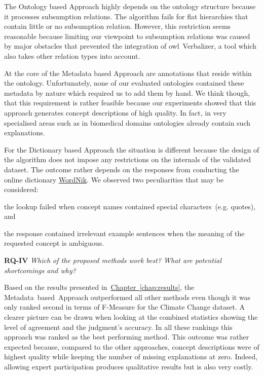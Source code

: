 The Ontology based Approach highly depends on the ontology structure because it processes subsumption relations. The algorithm fails for flat hierarchies that contain little or no subsumption relation. However, this restriction seems reasonable because limiting our viewpoint to subsumption relations was caused by major obstacles that prevented the integration of \gls{owl}~Verbalizer, a tool which also takes other relation types into account. 

At the core of the Metadata based Approach are annotations that reside within the ontology. Unfortunately, none of our evaluated ontologies contained these metadata by nature which required us to add them by hand. We think though, that this requirement is rather feasible because our experiments showed that this approach generates concept descriptions of high quality.  In fact, in very specialised areas such as in biomedical domains ontologies already contain such explanations. 

For the Dictionary based Approach the situation is different because the design of the algorithm does not impose any restrictions on the internals of the validated dataset. The outcome rather depends on the responses from conducting the online dictionary \hyperref[sec:wordnik]{WordNik}. We observed two peculiarities that may be considered:
\begin{inparaenum}[i)]
	\item the lookup failed when concept names contained special characters~(e.g. quotes), and
	\item the response contained irrelevant example sentences when the meaning of the requested concept is ambiguous.
\end{inparaenum}


\textbf{RQ-IV} \emph{Which of the proposed methods work best? What are potential shortcomings and why?} 

Based on the results presented in~\hyperref[chap:results]{Chapter~\ref*{chap:results}}, the Metadata~based~Approach outperformed all other methods even though it was only ranked second in terms of F-Measure for the Climate Change dataset. A clearer picture can be drawn when looking at the combined statistics showing the level of agreement and the judgment's accuracy. In all these rankings this approach was ranked as the best performing method. This outcome was rather expected because, compared to the other approaches, concept descriptions were of highest quality while keeping the number of missing explanations at zero. Indeed, allowing expert participation produces qualitative results but is also very costly.  

